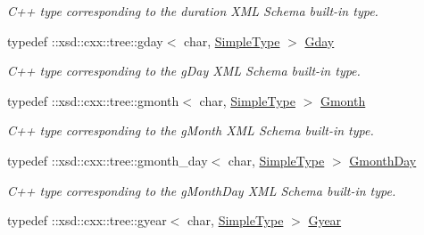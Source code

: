 \begin{DoxyCompactItemize}
\begin{DoxyCompactList}\small\item\em C++ type corresponding to the duration XML Schema built-\/in type. \item\end{DoxyCompactList}\item 
\hypertarget{namespacexml__schema_a5b06d49d8c16e03552ccb1b3965a885b}{
typedef ::xsd::cxx::tree::gday$<$ char, \hyperlink{namespacexml__schema_a1171be9b6e593e49b895a46671f5dc5f}{SimpleType} $>$ \hyperlink{namespacexml__schema_a5b06d49d8c16e03552ccb1b3965a885b}{Gday}}
\label{namespacexml__schema_a5b06d49d8c16e03552ccb1b3965a885b}

\begin{DoxyCompactList}\small\item\em C++ type corresponding to the gDay XML Schema built-\/in type. \item\end{DoxyCompactList}\item 
\hypertarget{namespacexml__schema_a3ba0912e4c675fb93fb759d6bfd46395}{
typedef ::xsd::cxx::tree::gmonth$<$ char, \hyperlink{namespacexml__schema_a1171be9b6e593e49b895a46671f5dc5f}{SimpleType} $>$ \hyperlink{namespacexml__schema_a3ba0912e4c675fb93fb759d6bfd46395}{Gmonth}}
\label{namespacexml__schema_a3ba0912e4c675fb93fb759d6bfd46395}

\begin{DoxyCompactList}\small\item\em C++ type corresponding to the gMonth XML Schema built-\/in type. \item\end{DoxyCompactList}\item 
\hypertarget{namespacexml__schema_a2c90cd4093544b12b5ce7fce76c22fb7}{
typedef ::xsd::cxx::tree::gmonth\_\-day$<$ char, \hyperlink{namespacexml__schema_a1171be9b6e593e49b895a46671f5dc5f}{SimpleType} $>$ \hyperlink{namespacexml__schema_a2c90cd4093544b12b5ce7fce76c22fb7}{GmonthDay}}
\label{namespacexml__schema_a2c90cd4093544b12b5ce7fce76c22fb7}

\begin{DoxyCompactList}\small\item\em C++ type corresponding to the gMonthDay XML Schema built-\/in type. \item\end{DoxyCompactList}\item 
\hypertarget{namespacexml__schema_a4ee36addde54a21b720c12f215d5a92e}{
typedef ::xsd::cxx::tree::gyear$<$ char, \hyperlink{namespacexml__schema_a1171be9b6e593e49b895a46671f5dc5f}{SimpleType} $>$ \hyperlink{namespacexml__schema_a4ee36addde54a21b720c12f215d5a92e}{Gyear}}
\label{namespacexml__schema_a4ee36addde54a21b720c12f215d5a92e}


\end{DoxyCompactItemize}
